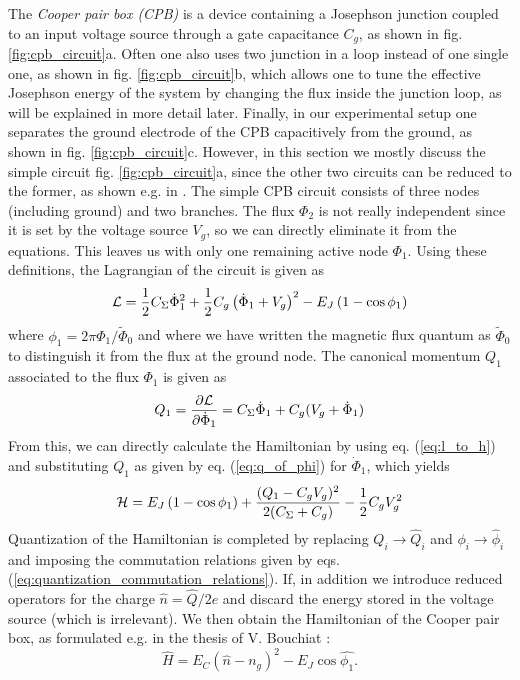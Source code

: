 The {\it Cooper pair box (CPB)} is a device containing a Josephson junction coupled to an input voltage source through a gate capacitance $C_g$, as shown in fig. \ref{fig:cpb_circuit}a. Often one also uses two junction in a loop instead of one single one, as shown in fig. \ref{fig:cpb_circuit}b, which allows one to tune the effective Josephson energy of the system by changing the flux inside the junction loop, as will be explained in more detail later. Finally, in our experimental setup one separates the ground electrode of the CPB capacitively from the ground, as shown in fig. \ref{fig:cpb_circuit}c. However, in this section we  mostly discuss the simple circuit fig. \ref{fig:cpb_circuit}a, since the other two circuits can be reduced to the former, as shown e.g. in \citep{koch_charge-insensitive_2007,nguyen_cooper_2008,palacios-laloy_superconducting_2010}. The simple CPB circuit consists of  three nodes (including ground) and two branches. The flux $\Phi_2$ is not really independent since it is set by the voltage source $V_g$, so we can directly eliminate it from the equations. This leaves us with only one remaining active node $\Phi_1$. Using these definitions, the Lagrangian of the circuit is given as
%
\begin{equation}
\begin{mathcal}L\end{mathcal}=\frac{1}{2}C_\Sigma\dot{\Phi}_1^2+\frac{1}{2}C_g\left(\dot{\Phi}_1+V_g\right)^2-E_J\left(1-\cos{\phi_1}\right)
\end{equation}
%
where $\phi_1=2\pi\Phi_1/\tilde{\Phi}_0$ and where we have written the magnetic flux quantum as $\tilde{\Phi}_0$ to distinguish it from the flux at the ground node. The canonical momentum $Q_1$ associated to the flux $\Phi_1$ is given as
%
\begin{equation}
Q_1 = \frac{\partial \begin{mathcal}L\end{mathcal}}{\partial \dot{\Phi}_1} = C_\Sigma \dot{\Phi}_1+C_g(V_g+\dot{\Phi}_1) \label{eq:q_of_phi}
\end{equation}
%
From this, we can directly calculate the Hamiltonian by using eq. (\ref{eq:l_to_h}) and substituting $Q_1$ as given by eq. (\ref{eq:q_of_phi}) for $\dot{\Phi}_1$, which yields
%
\begin{equation}
\begin{mathcal}H\end{mathcal} = E_J\left(1-\cos{\phi_1}\right)+\frac{(Q_1-C_g V_g)^2}{2(C_\Sigma+C_g)}-\frac{1}{2}C_g V_g^2
\end{equation}
%
Quantization of the Hamiltonian is completed by replacing $Q_i\to \hat{Q}_i$ and $\phi_i\to\hat{\phi}_i$ and imposing the commutation relations given by eqs. (\ref{eq:quantization_commutation_relations}). If, in addition we introduce reduced operators for the charge $\hat{n}=\hat{Q}/2e$ and discard the energy stored in the voltage source (which is irrelevant). We then obtain the Hamiltonian of the Cooper pair box, as formulated e.g. in the thesis of V. Bouchiat \citep{bouchiat_quantum_1998}:
%
\begin{equation}
\hat{H} = E_C \left( \hat{n} - n_g\right)^2-E_J \cos{\hat{\phi_1}}. \label{eq:cpb_hamiltonian}
\end{equation}
%

